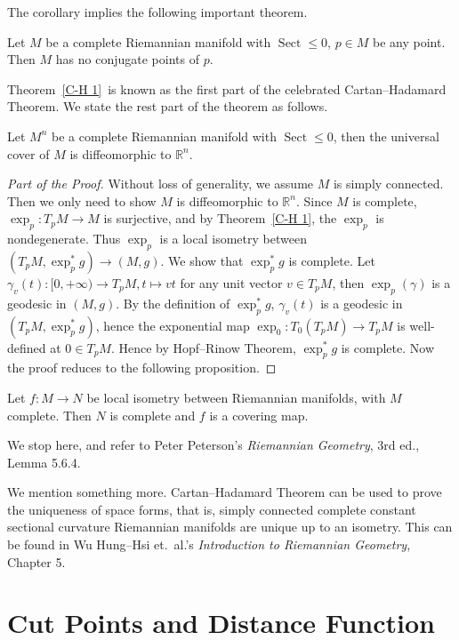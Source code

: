 The corollary implies the following important theorem.
\begin{thm}\label{C-H 1}
    Let $M$ be a complete Riemannian manifold with $\operatorname{Sect}\leq 0$, $p\in M$ be any point.
    Then $M$ has no conjugate points of $p$.
\end{thm}

Theorem~\ref{C-H 1}~is known as the first part of the celebrated Cartan--Hadamard Theorem.
We state the rest part of the theorem as follows.
\begin{thm}
    Let $M^n$ be a complete Riemannian manifold with $\operatorname{Sect}\leq 0$, then the universal cover of $M$ is diffeomorphic to $\mathbb{R}^n$.
\end{thm}
\begin{proof}[Part of the Proof]
    Without loss of generality, we assume $M$ is simply connected.
    Then we only need to show $M$ is diffeomorphic to $\mathbb{R}^n$.
    Since $M$ is complete, $\exp_p:T_pM\to M$ is surjective, and by Theorem~\ref{C-H 1}, the $\exp_p$ is nondegenerate.
    Thus $\exp_p$ is a local isometry between $(T_pM,\exp_p^*g)\to(M,g)$.
    We show that $\exp_p^*g$ is complete.
    Let $\gamma_v(t):[0,+\infty)\to T_pM, t\mapsto vt$ for any unit vector $v\in T_pM$, then $\exp_p(\gamma)$ is a geodesic in $(M,g)$.
    By the definition of $\exp_p^*g$, $\gamma_v(t)$ is a geodesic in $(T_pM,\exp_p^*g)$, hence the exponential map $\exp_0:T_0(T_pM)\to T_pM$ is well-defined at $0\in T_pM$.
    Hence by Hopf--Rinow Theorem, $\exp_p^*g$ is complete.
    Now the proof reduces to the following proposition.
\end{proof}

\begin{prop}
    Let $f:M\to N$ be local isometry between Riemannian manifolds, with $M$ complete.
    Then $N$ is complete and $f$ is a covering map.
\end{prop}

We stop here, and refer to Peter Peterson's \emph{Riemannian Geometry}, 3rd ed., Lemma 5.6.4.

We mention something more.
Cartan--Hadamard Theorem can be used to prove the uniqueness of space forms, that is, simply connected complete constant sectional curvature Riemannian manifolds are unique up to an isometry.
This can be found in Wu Hung--Hsi et.\ al.'s \emph{Introduction to Riemannian Geometry}, Chapter 5.

\section{Cut Points and Distance Function}

